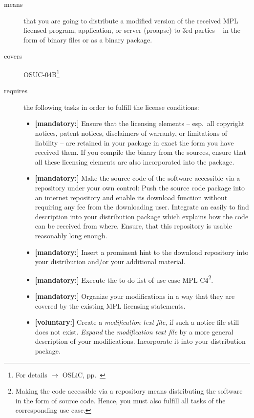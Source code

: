 \begin{description}
\item[means] that you are going to distribute a modified version of the received
MPL licensed pro\-gram, application, or server (proapse) to 3rd parties -- in
the form of binary files or as a binary package.
\item[covers] OSUC-04B\footnote{For details $\rightarrow$ OSLiC, pp.\
\pageref{OSUC-04B-DEF}}
\item[requires] the following tasks in order to fulfill the license conditions:
\begin{itemize}

  \item \textbf{[mandatory:]} Ensure that the licensing elements -- esp.\ all
  copyright notices, patent notices, disclaimers of warranty, or limitations of
  liability -- are retained in your package in exact the form you have received
  them. If you compile the binary from the sources, ensure that all these
  licensing elements are also incorporated into the package.

  \item \textbf{[mandatory:]} Make the source code of the software accessible
  via a repository under your own control: Push the source code package into an
  internet repository and enable its download function without requiring any fee
  from the downloading user. Integrate an easily to find description into your
  distribution package which explains how the code can be received from where.
  Ensure, that this repository is usable reasonably long enough.
  
  \item \textbf{[mandatory:]} Insert a prominent hint to the download repository
  into your distribution and/or your additional material. 

  \item \textbf{[mandatory:]} Execute the to-do list of use case MPL-C4\footnote{
  Making the code accessible via a repository means distributing the software in
  the form of source code. Hence, you must also fulfill all tasks of the
  corresponding use case.}.

  \item \textbf{[mandatory:]} Organize your modifications in a way that they are
  covered by the existing MPL licensing statements.
  
  \item \textbf{[voluntary:]} Create a \emph{modification text file}, if such a
  notice file still does not exist. \emph{Expand} the \emph{modification text
  file} by a more general description of your modifications. Incorporate it into
  your distribution package.
  

\end{itemize}
\end{description}
